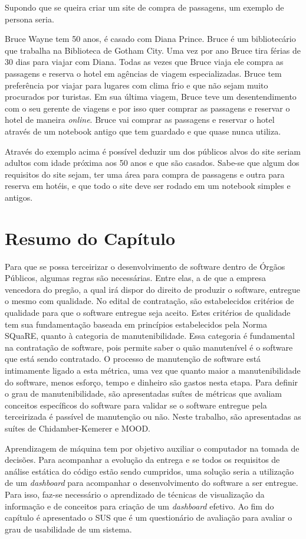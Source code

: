 Supondo que se queira criar um site de compra de passagens, um exemplo de persona seria. 

Bruce Wayne tem 50 anos, é casado com Diana Prince. Bruce é  um bibliotecário que trabalha na Biblioteca de Gotham City. Uma vez por ano Bruce tira férias de 30 dias para viajar com Diana. Todas as vezes que Bruce viaja ele compra as passagens e reserva o hotel em agências de viagem especializadas. Bruce tem preferência por viajar para lugares com clima frio e que não sejam muito procurados por turistas. Em sua última viagem, Bruce teve um desentendimento com o seu gerente de viagens e por isso quer comprar as passagens e reservar o hotel de maneira \textit{online}. Bruce vai comprar as passagens e reservar o hotel através de um notebook antigo que tem guardado e que quase nunca utiliza.

Através do exemplo acima é possível deduzir um dos públicos alvos do site seriam adultos com idade próxima aos 50 anos e que são casados. Sabe-se que algum dos requisitos do site sejam, ter uma área para compra de passagens e outra para reserva em hotéis, e que todo o site deve ser rodado em um notebook simples e antigos.


\section{Resumo do Capítulo}
Para que se possa terceirizar o desenvolvimento de software dentro de Órgãos Públicos, algumas regras são necessárias. Entre elas, a de que a empresa vencedora do pregão, a qual irá dispor do direito de produzir o software, entregue o mesmo com qualidade. No edital de contratação, são estabelecidos critérios de qualidade para que o software entregue seja aceito. Estes critérios de qualidade tem sua fundamentação baseada em princípios estabelecidos pela Norma SQuaRE, quanto à categoria de manutenibilidade. Essa categoria é fundamental na contratação de software, pois permite saber o quão manutenível é o software que está sendo contratado. O processo de manutenção de software está intimamente ligado a esta métrica, uma vez que quanto maior a manutenibilidade do software, menos esforço, tempo e dinheiro são gastos nesta etapa. Para definir o grau de manutenibilidade, são apresentadas suítes de métricas que avaliam conceitos específicos do software para validar se o software entregue pela terceirizada é passível de manutenção ou não. Neste trabalho, são apresentadas as suítes de Chidamber-Kemerer e MOOD. 

Aprendizagem de máquina tem por objetivo auxiliar o computador na tomada de decisões. Para acompanhar a evolução da entrega e se todos os requisitos de análise estática do código estão sendo cumpridos, uma solução seria a utilização de um \textit{dashboard} para acompanhar o desenvolvimento do software a ser entregue. Para isso, faz-se necessário o aprendizado de técnicas de visualização da informação e de conceitos para criação de um \textit{dashboard} efetivo. Ao fim do capítulo é apresentado o SUS que é um questionário de avaliação para avaliar o grau de usabilidade de um sistema.